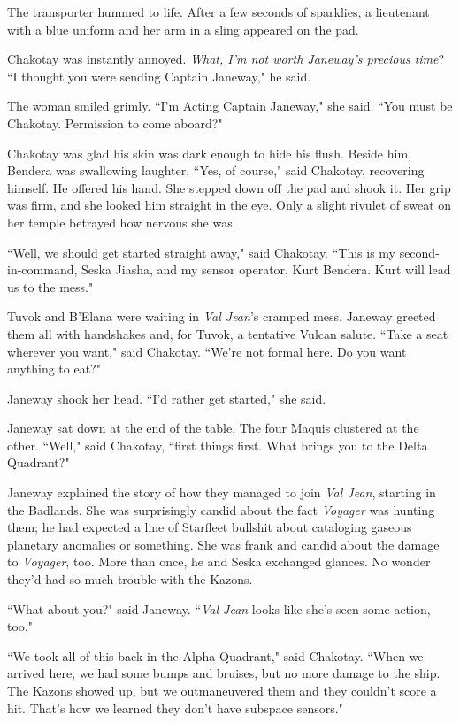 \documentclass[twoside,letterpaper,12pt]{memoir}
\begin{document}
The transporter hummed to life. After a few seconds of sparklies, a lieutenant with a blue uniform and her arm in a sling appeared on the pad.

Chakotay was instantly annoyed. \textit{What, I'm not worth Janeway's precious time}? ``I thought you were sending Captain Janeway," he said.

The woman smiled grimly. ``I'm Acting Captain Janeway," she said. ``You must be Chakotay. Permission to come aboard?"

Chakotay was glad his skin was dark enough to hide his flush. Beside him, Bendera was swallowing laughter. ``Yes, of course," said Chakotay, recovering himself. He offered his hand. She stepped down off the pad and shook it. Her grip was firm, and she looked him straight in the eye. Only a slight rivulet of sweat on her temple betrayed how nervous she was.

``Well, we should get started straight away," said Chakotay. ``This is my second-in-command, Seska Jiasha, and my sensor operator, Kurt Bendera. Kurt will lead us to the mess."

Tuvok and B'Elana were waiting in \textit{Val Jean}'s cramped mess. Janeway greeted them all with handshakes and, for Tuvok, a tentative Vulcan salute. ``Take a seat wherever you want," said Chakotay. ``We're not formal here. Do you want anything to eat?"

Janeway shook her head. ``I'd rather get started," she said.

Janeway sat down at the end of the table. The four Maquis clustered at the other. ``Well," said Chakotay, ``first things first. What brings you to the Delta Quadrant?"

Janeway explained the story of how they managed to join \textit{Val Jean}, starting in the Badlands. She was surprisingly candid about the fact \textit{Voyager} was hunting them; he had expected a line of Starfleet bullshit about cataloging gaseous planetary anomalies or something. She was frank and candid about the damage to \textit{Voyager}, too. More than once, he and Seska exchanged glances. No wonder they'd had so much trouble with the Kazons.

``What about you?" said Janeway. ``\textit{Val Jean} looks like she's seen some action, too."

``We took all of this back in the Alpha Quadrant," said Chakotay. ``When we arrived here, we had some bumps and bruises, but no more damage to the ship. The Kazons showed up, but we outmaneuvered them and they couldn't score a hit. That's how we learned they don't have subspace sensors."
\end{document}
